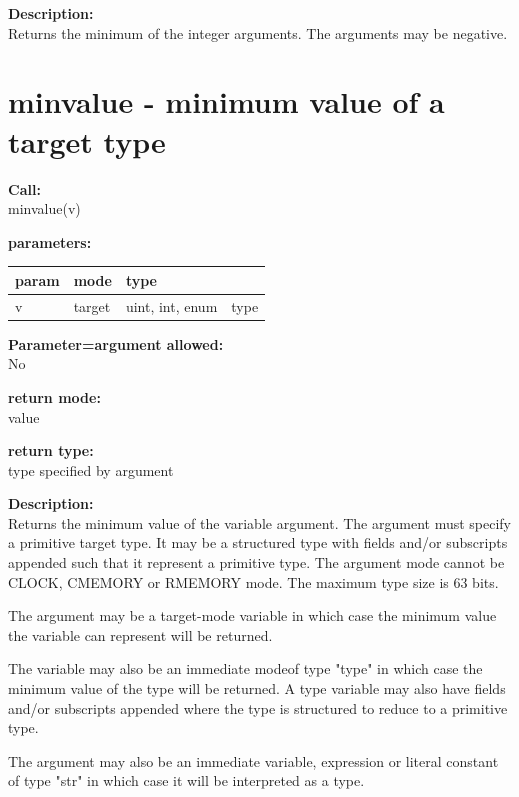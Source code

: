         {\bf Description:} \\
        Returns the minimum of the integer arguments. The arguments may
        be negative.


    \section{minvalue - minimum value of a target type}\label{sec:ifminvalue}
        
        
        {\bf Call:} \\
        minvalue(v)
        
        {\bf parameters:} \\
        \begin{tabular}{| l | l | l | l |}
        \hline
        param  & mode & type & \\
        \hline \hline
        v & target & uint, int, enum & type    \\ \hline
        \end{tabular}
        
        {\bf Parameter=argument allowed:} \\
        No
        
        {\bf return mode:} \\
        value

        {\bf return type:} \\
        type specified by argument
        
        {\bf Description:} \\
        Returns the minimum value of the variable argument. The argument must
        specify a primitive target type. It may be a structured type with fields
        and/or subscripts appended such that it represent a primitive type. The
        argument mode cannot be CLOCK, CMEMORY or RMEMORY mode. The maximum type
        size is 63 bits.

        The argument may be a target-mode variable in which case the minimum
        value the variable can represent will be returned.

        The variable may also be an immediate modeof type "type" in which case
        the minimum value of the type will be returned. A type variable may also
        have fields and/or subscripts appended where the type is structured to
        reduce to a primitive type.

        The argument may also be an immediate variable, expression or literal
        constant of type "str" in which case it will be interpreted as a type.

